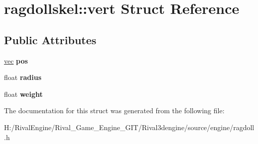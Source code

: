 \hypertarget{structragdollskel_1_1vert}{}\section{ragdollskel\+:\+:vert Struct Reference}
\label{structragdollskel_1_1vert}
\subsection*{Public Attributes}
\begin{DoxyCompactItemize}
\item 
\mbox{\label{structragdollskel_1_1vert_a8985e06527aadef0abc8accd0997fc49}} 
\hyperlink{structvec}{vec} {\bfseries pos}
\item 
\mbox{\label{structragdollskel_1_1vert_a01f22232f512134c03609e0908d8015b}} 
float {\bfseries radius}
\item 
\mbox{\label{structragdollskel_1_1vert_a40b369470900ba19c72fb8acf30b4d99}} 
float {\bfseries weight}
\end{DoxyCompactItemize}


The documentation for this struct was generated from the following file\+:\begin{DoxyCompactItemize}
\item 
H\+:/\+Rival\+Engine/\+Rival\+\_\+\+Game\+\_\+\+Engine\+\_\+\+G\+I\+T/\+Rival3dengine/source/engine/ragdoll.\+h\end{DoxyCompactItemize}
